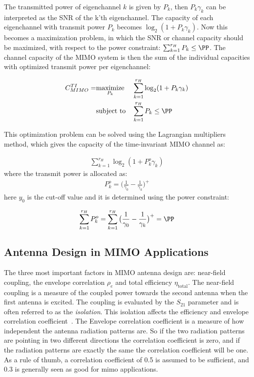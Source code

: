 The transmitted power of eigenchannel $k$ is given by $P_k$, then $P_k\gamma_k$ can be interpreted as the SNR of the k'th eigenchannel. The capacity of each eigenchannel with transmit power $P_k$ becomes $\log_2 (1 + P_k\gamma_k)$. Now this becomes a maximization problem, in which the SNR or channel capacity should be maximized, with respect to the power constraint: $\sum_{k=1}^{r_H} P_k \leq \PP$. 
The channel capacity of the MIMO system is then the sum of the individual capacities with optimized transmit power per eigenchannel: 


\begin{equation*}
\begin{aligned}
C^{TI}_{MIMO} = 
& \underset{P_k}{\text{maximize}}
& & \sum_{k=1}^{r_H} \log_2 (1 + P_k\gamma_k) \\
& \text{subject to}
& & \sum_{k=1}^{r_H} P_k \leq \PP
\end{aligned}
\end{equation*}

This optimization problem can be solved using the Lagrangian multipliers method, which gives the capacity of the time-invariant MIMO channel as\cite{Tim2012Practical}: 

\begin{align*}
  \sum_{k=1}^{r_H} \log_2 (1 + P^o_k\gamma_k)
\end{align*}
where the transmit power is allocated as: 
\begin{align*}
  P_k^o = \big(\frac{1}{\gamma_0} - \frac{1}{\gamma_k}\big)^+ 
\end{align*}
here $y_0$ is the cut-off value and it is determined using the power constraint: 

\begin{align*}
  \sum_{k=1}^{r_H} P_k^o = \sum_{k=1}^{r_H} \big(\frac{1}{\gamma_0} - \frac{1}{\gamma_k}\big)^+ = \PP
\end{align*}

\subsection{Antenna Design in MIMO Applications}
\label{sec:mimoant}
The three most important factors in MIMO antenna design are: near-field coupling, the envelope correlation $\rho_e$ and total efficiency $\eta_{\text{total}}$. The near-field coupling is a measure of the coupled power towards the second antenna when the first antenna is excited. The coupling is evaluated by the $S_{21}$ parameter and is often referred to as the \emph{isolation}. This isolation affects the efficiency and envelope correlation coefficient~\cite{Tatomirescu2011PortIsolation}. The Envelope correlation coefficient is a measure of how independent the antenna radiation patterns are. So if the two radiation patterns are pointing in two different directions the correlation coefficient is zero, and if the radiation patterns are exactly the same the correlation coefficient will be one. As a rule of thumb, a correlation coefficient of \num{0.5} is assumed to be sufficient, and \num{0.3} is generally seen as good for mimo applications\cite{Tim2012Practical}.

